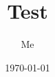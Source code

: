 \documentclass{article}
\title{Test}
\author{Me}
\date\today
\theoremstyle{remark}
\begin{document}
\maketitle

\\
\end{document}
